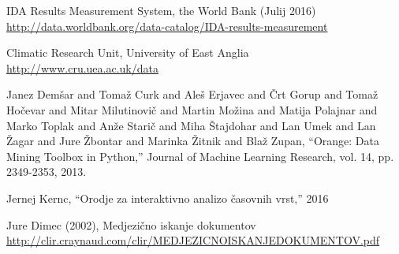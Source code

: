 \begin{thebibliography}{1}
 IDA Results Measurement System, the World Bank (Julij 2016)
\\ \url{http://data.worldbank.org/data-catalog/IDA-results-measurement}

 Climatic Research Unit, University of East Anglia
\\ \url{http://www.cru.uea.ac.uk/data}

 Janez Demšar and Tomaž Curk and Aleš Erjavec and Črt Gorup and Tomaž Hočevar and Mitar Milutinovič and Martin Možina and Matija Polajnar and Marko Toplak and Anže Starič and Miha Štajdohar and Lan Umek and Lan Žagar and Jure Žbontar and Marinka Žitnik and Blaž Zupan, ``Orange: Data Mining Toolbox in Python,'' Journal of Machine Learning Research, vol. 14, pp. 2349-2353, 2013.


 Jernej Kernc, ``Orodje za interaktivno analizo časovnih vrst,'' 2016





 Jure Dimec (2002), Medjezično iskanje dokumentov 
\\ \url{http://clir.craynaud.com/clir/MEDJEZICNOISKANJEDOKUMENTOV.pdf}



\end{thebibliography}


